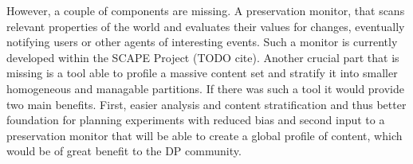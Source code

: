 However, a couple of components are missing. A preservation monitor, that scans relevant properties of the world and evaluates their values for changes, eventually notifying users or other agents of interesting events. Such a monitor is currently developed within the SCAPE Project (TODO cite).
Another crucial part that is missing is a tool able to profile a massive content set and stratify it into smaller homogeneous and managable partitions. If there was such a tool it would provide two main benefits. First, easier analysis and content stratification and thus better foundation for planning experiments with reduced bias and second input to a preservation monitor that will be able to create a global profile of content, which would be of great benefit to the DP community.

